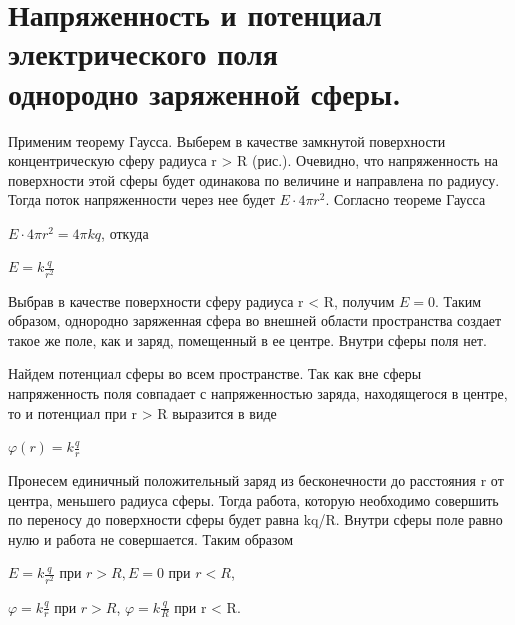 \documentclass[12pt]{report}
\begin{document}
\section{Напряженность и потенциал электрического поля\\ однородно заряженной сферы.}
Применим теорему Гаусса. Выберем в качестве замкнутой поверхности концентрическую сферу радиуса r > R (рис.). Очевидно, что напряженность на поверхности этой сферы будет одинакова по величине и направлена по радиусу. Тогда поток напряженности через нее будет $E \cdot 4\pi r^2$. Согласно теореме Гаусса
\begin{center}
    $E \cdot 4 \pi r^2 = 4 \pi k q$, откуда
\end{center}
\begin{center}
    $E = k \frac{q}{r^2}$
\end{center}
\par Выбрав в качестве поверхности сферу радиуса r < R, получим $E = 0$.
Таким образом, однородно заряженная сфера во внешней области пространства
создает такое же поле, как и заряд, помещенный в ее центре.
Внутри сферы поля нет.

Найдем потенциал сферы во всем пространстве.
Так как вне сферы напряженность поля совпадает с напряженностью заряда,
находящегося в центре, то и потенциал при r > R выразится в виде
\begin{center}
    $\varphi(r) = k \frac{q}{r}$
\end{center}
Пронесем единичный положительный заряд из бесконечности до расстояния r от центра,
меньшего радиуса сферы.
Тогда работа, которую необходимо совершить по переносу
до поверхности сферы будет равна kq/R.
Внутри сферы поле равно нулю и работа не совершается. Таким образом
\begin{center}
    $E = k \frac{q}{r^2}$ при $r > R, E = 0$ при $r < R$,
\end{center}
\begin{center}
    $\varphi = k \frac{q}{r}$ при $r > R$, $\varphi = k \frac{q}{R}$ при r < R.
\end{center}
\end{document}
